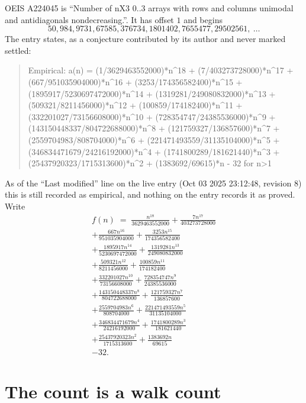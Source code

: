 \documentclass[11pt,a4paper]{article}
\theoremstyle{plain}
\theoremstyle{definition}
\begin{document}
OEIS A224045 is ``Number of nX3 0..3 arrays with rows and columns unimodal and antidiagonals nondecreasing.''. It has offset $1$ and begins
\[
50, 984, 9731, 67585, 376734, 1801402, 7655477, 29502561,\ \dots
\]
The entry states, as a conjecture contributed by its author and never marked settled:
\begin{quote}\raggedright\small
Empirical: a(n) = (1/3629463552000)*n\^{}18 + (7/403273728000)*n\^{}17 + (667/951035904000)*n\^{}16 + (3253/174356582400)*n\^{}15 + (1895917/5230697472000)*n\^{}14 + (1319281/249080832000)*n\^{}13 + (509321/8211456000)*n\^{}12 + (100859/174182400)*n\^{}11 + (332201027/73156608000)*n\^{}10 + (728354747/24385536000)*n\^{}9 + (143150448337/804722688000)*n\^{}8 + (121759327/136857600)*n\^{}7 + (2559704983/808704000)*n\^{}6 + (221471493559/31135104000)*n\^{}5 + (346834471679/24216192000)*n\^{}4 + (1741800289/181621440)*n\^{}3 + (25437920323/1715313600)*n\^{}2 + (1383692/69615)*n - 32 for n>1
\end{quote}
As of the ``Last modified'' line on the live entry (Oct 03 2025 23:12:48, revision 8) this is still
recorded as empirical, and nothing on the entry records it as proved. Write
\begin{multline*}
f(n)\;=\;\frac{n^{18}}{3629463552000} + \frac{7 n^{17}}{403273728000} \\
+ \frac{667 n^{16}}{951035904000} + \frac{3253 n^{15}}{174356582400} \\
+ \frac{1895917 n^{14}}{5230697472000} + \frac{1319281 n^{13}}{249080832000} \\
+ \frac{509321 n^{12}}{8211456000} + \frac{100859 n^{11}}{174182400} \\
+ \frac{332201027 n^{10}}{73156608000} + \frac{728354747 n^{9}}{24385536000} \\
+ \frac{143150448337 n^{8}}{804722688000} + \frac{121759327 n^{7}}{136857600} \\
+ \frac{2559704983 n^{6}}{808704000} + \frac{221471493559 n^{5}}{31135104000} \\
+ \frac{346834471679 n^{4}}{24216192000} + \frac{1741800289 n^{3}}{181621440} \\
+ \frac{25437920323 n^{2}}{1715313600} + \frac{1383692 n}{69615} \\
- 32.
\end{multline*}

\section{The count is a walk count}
\end{document}
